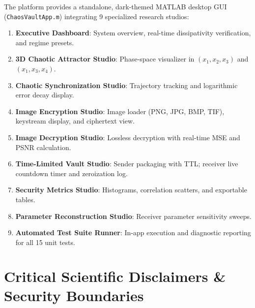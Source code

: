 \documentclass[12pt,a4paper,oneside]{report}
\begin{document}
The platform provides a standalone, dark-themed MATLAB desktop GUI (\texttt{ChaosVaultApp.m}) integrating 9 specialized research studios:
\begin{enumerate}
    \item \textbf{Executive Dashboard}: System overview, real-time dissipativity verification, and regime presets.
    \item \textbf{3D Chaotic Attractor Studio}: Phase-space visualizer in $(x_1, x_2, x_3)$ and $(x_1, x_3, x_4)$.
    \item \textbf{Chaotic Synchronization Studio}: Trajectory tracking and logarithmic error decay display.
    \item \textbf{Image Encryption Studio}: Image loader (PNG, JPG, BMP, TIF), keystream display, and ciphertext view.
    \item \textbf{Image Decryption Studio}: Lossless decryption with real-time MSE and PSNR calculation.
    \item \textbf{Time-Limited Vault Studio}: Sender packaging with TTL; receiver live countdown timer and zeroization log.
    \item \textbf{Security Metrics Studio}: Histograms, correlation scatters, and exportable tables.
    \item \textbf{Parameter Reconstruction Studio}: Receiver parameter sensitivity sweeps.
    \item \textbf{Automated Test Suite Runner}: In-app execution and diagnostic reporting for all 15 unit tests.
\end{enumerate}

\chapter{Critical Scientific Disclaimers \& Security Boundaries}
\end{document}
